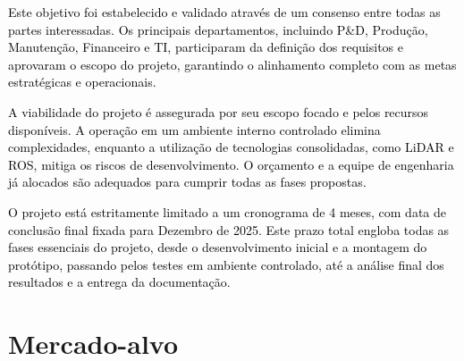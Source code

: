 \textcolor{black}{Este objetivo foi estabelecido e validado através de um consenso entre todas as partes interessadas. Os principais departamentos, incluindo P\&D, Produção, Manutenção, Financeiro e TI, participaram da definição dos requisitos e aprovaram o escopo do projeto, garantindo o alinhamento completo com as metas estratégicas e operacionais.}

\textcolor{black}{A viabilidade do projeto é assegurada por seu escopo focado e pelos recursos disponíveis. A operação em um ambiente interno controlado elimina complexidades, enquanto a utilização de tecnologias consolidadas, como LiDAR e ROS, mitiga os riscos de desenvolvimento. O orçamento e a equipe de engenharia já alocados são adequados para cumprir todas as fases propostas.}

\textcolor{black}{O projeto está estritamente limitado a um cronograma de 4 meses, com data de conclusão final fixada para Dezembro de 2025. Este prazo total engloba todas as fases essenciais do projeto, desde o desenvolvimento inicial e a montagem do protótipo, passando pelos testes em ambiente controlado, até a análise final dos resultados e a entrega da documentação.}
     
   
   

\section{Mercado-alvo}

